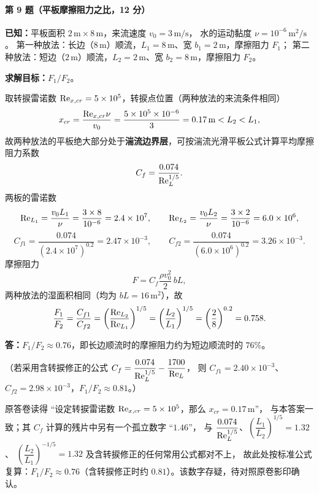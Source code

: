 \paragraph{第 9 题（平板摩擦阻力之比，12 分）}
\begin{jie}
\textbf{已知：}平板面积 $2\,\mathrm{m}\times8\,\mathrm{m}$，来流速度 $v_0=3\,\mathrm{m/s}$，
水的运动黏度 $\nu=10^{-6}\,\mathrm{m^{2}/s}$。
第一种放法：长边（$8\,\mathrm{m}$）顺流，$L_1=8\,\mathrm{m}$、宽 $b_1=2\,\mathrm{m}$，摩擦阻力 $F_1$；
第二种放法：短边（$2\,\mathrm{m}$）顺流，$L_2=2\,\mathrm{m}$、宽 $b_2=8\,\mathrm{m}$，摩擦阻力 $F_2$。

\textbf{求解目标：}$F_1/F_2$。

取转捩雷诺数 $\mathrm{Re}_{x,cr}=5\times10^{5}$，转捩点位置（两种放法的来流条件相同）
\[
x_{cr}=\frac{\mathrm{Re}_{x,cr}\nu}{v_0}=\frac{5\times10^{5}\times10^{-6}}{3}=0.17\,\mathrm{m}
<L_2<L_1,
\]
故两种放法的平板绝大部分处于\textbf{湍流边界层}，可按湍流光滑平板公式计算平均摩擦阻力系数
\[
C_f=\frac{0.074}{\mathrm{Re}_L^{1/5}} .
\]
两板的雷诺数
\[
\mathrm{Re}_{L_1}=\frac{v_0L_1}{\nu}=\frac{3\times8}{10^{-6}}=2.4\times10^{7},
\qquad
\mathrm{Re}_{L_2}=\frac{v_0L_2}{\nu}=\frac{3\times2}{10^{-6}}=6.0\times10^{6},
\]
\[
C_{f1}=\frac{0.074}{(2.4\times10^{7})^{0.2}}=2.47\times10^{-3},
\qquad
C_{f2}=\frac{0.074}{(6.0\times10^{6})^{0.2}}=3.26\times10^{-3}.
\]
摩擦阻力
\[
F=C_f\frac{\rho v_0^{2}}{2}\,bL ,
\]
两种放法的湿面积相同（均为 $bL=16\,\mathrm{m^{2}}$），故
\[
\frac{F_1}{F_2}=\frac{C_{f1}}{C_{f2}}
=\left(\frac{\mathrm{Re}_{L_2}}{\mathrm{Re}_{L_1}}\right)^{1/5}
=\left(\frac{L_2}{L_1}\right)^{1/5}
=\left(\frac{2}{8}\right)^{0.2}=0.758 .
\]

\textbf{答：}$F_1/F_2\approx0.76$，即长边顺流时的摩擦阻力约为短边顺流时的 $76\%$。

（若采用含转捩修正的公式 $C_f=\dfrac{0.074}{\mathrm{Re}_L^{1/5}}-\dfrac{1700}{\mathrm{Re}_L}$，
则 $C_{f1}=2.40\times10^{-3}$、$C_{f2}=2.98\times10^{-3}$，$F_1/F_2\approx0.81$。）
\end{jie}

\begin{tishi}
原答卷读得 ``设定转捩雷诺数 $\mathrm{Re}_{x,cr}=5\times10^{5}$，那么 $x_{cr}=0.17\,\mathrm{m}$''，
与本答案一致；其 $C_f$ 计算的残片中另有一个孤立数字 ``$1.46$''，
与 $\dfrac{0.074}{\mathrm{Re}_L^{1/5}}$、$\left(\dfrac{L_1}{L_2}\right)^{1/5}=1.32$、
$\left(\dfrac{L_2}{L_1}\right)^{-1/5}=1.32$ 及含转捩修正的任何常用公式都对不上，
故此处按标准公式复算：$F_1/F_2\approx0.76$（含转捩修正时约 $0.81$）。该数字存疑，待对照原卷影印确认。
\end{tishi}

